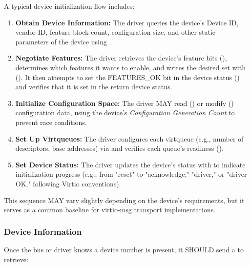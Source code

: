 A typical device initialization flow includes:
\begin{enumerate}
  \item \textbf{Obtain Device Information:}  
    The driver queries the device's Device ID, vendor ID, feature block count,
    configuration size, and other static parameters of the device using
    .
  \item \textbf{Negotiate Features:}  
    The driver retrieves the device's feature bits (),
    determines which features it wants to enable, and writes the desired set
    with ().  It then attempts to set the
    FEATURES_OK bit in the device status () and
    verifies that it is set in the return device status.
  \item \textbf{Initialize Configuration Space:}  
    The driver MAY read () or modify ()
    configuration data, using the device's \emph{Configuration Generation Count}
    to prevent race conditions.
  \item \textbf{Set Up Virtqueues:}  
    The driver configures each virtqueue (e.g., number of descriptors, base
    addresses) via  and verifies each queue's readiness
    ().
  \item \textbf{Set Device Status:}  
    The driver updates the device's status with  to
    indicate initialization progress (e.g., from "reset" to "acknowledge,"
    "driver," or "driver OK," following Virtio conventions).
\end{enumerate}

This sequence MAY vary slightly depending on the device's requirements, but it
serves as a common baseline for virtio-msg transport implementations.

\subsubsection{Device Information}
\label{sec:Virtio Transport Options / Virtio Over Messages / Device Initialization / Device Information}

Once the bus or driver knows a device number is present, it SHOULD send a
 to retrieve:

